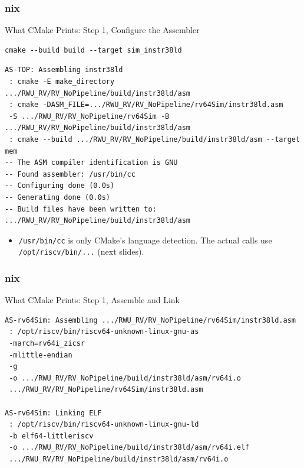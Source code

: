 \documentclass{beamer}
\newcommand{\astitle}{nix}
\newcommand{\assubtitle}{nix}
\newcommand{\cmd}[1]{\texttt{#1}}
\begin{document}
\renewcommand{\assubtitle}{What CMake Prints: Step 1, Configure the Assembler}
\begin{frame}[fragile]
\frametitle{\astitle}
\begin{block}{\assubtitle}
\begin{lstlisting}[style=sh]
cmake --build build --target sim_instr38ld
\end{lstlisting}
\begin{lstlisting}[style=out]
AS-TOP: Assembling instr38ld
 : cmake -E make_directory .../RWU_RV/RV_NoPipeline/build/instr38ld/asm
 : cmake -DASM_FILE=.../RWU_RV/RV_NoPipeline/rv64Sim/instr38ld.asm
 -S .../RWU_RV/RV_NoPipeline/rv64Sim -B .../RWU_RV/RV_NoPipeline/build/instr38ld/asm
 : cmake --build .../RWU_RV/RV_NoPipeline/build/instr38ld/asm --target mem
-- The ASM compiler identification is GNU
-- Found assembler: /usr/bin/cc
-- Configuring done (0.0s)
-- Generating done (0.0s)
-- Build files have been written to: .../RWU_RV/RV_NoPipeline/build/instr38ld/asm
\end{lstlisting}
  \begin{itemize}
    \item \cmd{/usr/bin/cc} is only CMake's language detection. The actual calls
      use \cmd{/opt/riscv/bin/...} (next slides).
  \end{itemize}
\end{block}
\end{frame}

\renewcommand{\assubtitle}{What CMake Prints: Step 1, Assemble and Link}
\begin{frame}[fragile]
\frametitle{\astitle}
\begin{block}{\assubtitle}
\begin{lstlisting}[style=out]
AS-rv64Sim: Assembling .../RWU_RV/RV_NoPipeline/rv64Sim/instr38ld.asm
 : /opt/riscv/bin/riscv64-unknown-linux-gnu-as
 -march=rv64i_zicsr
 -mlittle-endian
 -g
 -o .../RWU_RV/RV_NoPipeline/build/instr38ld/asm/rv64i.o
 .../RWU_RV/RV_NoPipeline/rv64Sim/instr38ld.asm

AS-rv64Sim: Linking ELF
 : /opt/riscv/bin/riscv64-unknown-linux-gnu-ld
 -b elf64-littleriscv
 -o .../RWU_RV/RV_NoPipeline/build/instr38ld/asm/rv64i.elf
 .../RWU_RV/RV_NoPipeline/build/instr38ld/asm/rv64i.o
\end{lstlisting}
\end{block}
\end{frame}
\end{document}
